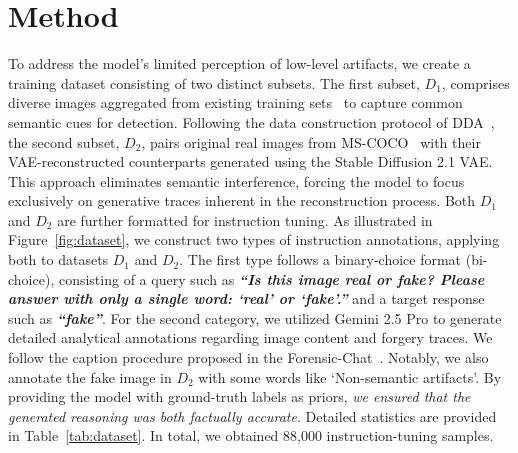 \documentclass{article}
\theoremstyle{plain}
\theoremstyle{definition}
\theoremstyle{remark}
\begin{document}
\vspace*{-2mm}


\section{Method}
\label{sec:method}

To address the model's limited perception of low-level artifacts, we create a training dataset consisting of two distinct subsets.
{The first subset, $D_1$, comprises diverse images aggregated from existing training sets~\cite{russakovsky2015imagenet,unsplash_data_2025,zhu2023genimage,ye2025echo} to capture common semantic cues for detection. 
Following the data construction protocol of DDA~\cite{chen2025dual}, the second subset, $D_2$, pairs original real images from MS-COCO~\cite{coco} with their VAE-reconstructed counterparts generated using the Stable Diffusion 2.1 VAE. } 
This approach eliminates semantic interference, forcing the model to focus exclusively on generative traces inherent in the reconstruction process.
Both $D_1$ and $D_2$ are further formatted for instruction tuning. 
As illustrated in Figure~\ref{fig:dataset}, we construct two types of instruction annotations, applying both to datasets $D_1$ and $D_2$. 
The first type follows a binary-choice format (bi-choice), consisting of a query such as \textbf{\textit{``Is this image real or fake? Please answer with only a single word: `real' or `fake'.''}} and a target response such as \textbf{\textit{``fake''}}.
For the second category, we utilized Gemini 2.5 Pro to generate detailed analytical annotations regarding image content and forgery traces.
We follow the caption procedure proposed in the Forensic-Chat~\cite{lin2025seeing}.
Notably, we also annotate the fake image in $D_2$ with some words like `Non-semantic artifacts'.
By providing the model with ground-truth labels as priors, \textit{we ensured that the generated reasoning was both factually accurate}. 
Detailed statistics are provided in Table~\ref{tab:dataset}.
In total, we obtained 88,000 instruction-tuning samples.
\end{document}
